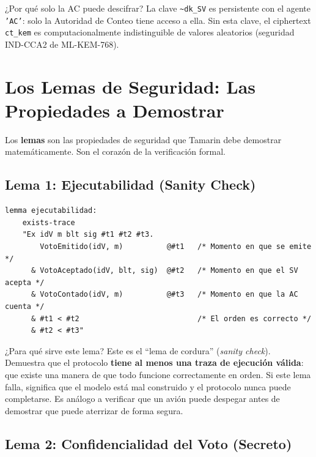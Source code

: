 \documentclass[12pt, a4paper]{article}
\begin{document}
\begin{cajaConceto}{¿Por qué solo la AC puede descifrar?}
La clave \texttt{{\textasciitilde}dk\_SV} es persistente con el agente
\texttt{'AC'}: solo la Autoridad de Conteo tiene acceso a ella. Sin esta
clave, el ciphertext \texttt{ct\_kem} es computacionalmente indistinguible
de valores aleatorios (seguridad IND-CCA2 de ML-KEM-768).
\end{cajaConceto}

\section{Los Lemas de Seguridad: Las Propiedades a Demostrar}

Los \textbf{lemas} son las propiedades de seguridad que Tamarin debe
demostrar matemáticamente. Son el corazón de la verificación formal.

\subsection{Lema 1: Ejecutabilidad (Sanity Check)}

\begin{lstlisting}[caption={Lema de ejecutabilidad del protocolo.}]
lemma ejecutabilidad:
    exists-trace
    "Ex idV m blt sig #t1 #t2 #t3.
        VotoEmitido(idV, m)          @#t1   /* Momento en que se emite */
      & VotoAceptado(idV, blt, sig)  @#t2   /* Momento en que el SV acepta */
      & VotoContado(idV, m)          @#t3   /* Momento en que la AC cuenta */
      & #t1 < #t2                           /* El orden es correcto */
      & #t2 < #t3"
\end{lstlisting}

\begin{cajaConceto}{¿Para qué sirve este lema?}
Este es el ``lema de cordura'' (\textit{sanity check}). Demuestra que
el protocolo \textbf{tiene al menos una traza de ejecución válida}: que
existe una manera de que todo funcione correctamente en orden. Si este lema
falla, significa que el modelo está mal construido y el protocolo nunca
puede completarse. Es análogo a verificar que un avión puede despegar
antes de demostrar que puede aterrizar de forma segura.
\end{cajaConceto}

\subsection{Lema 2: Confidencialidad del Voto (Secreto)}
\end{document}
